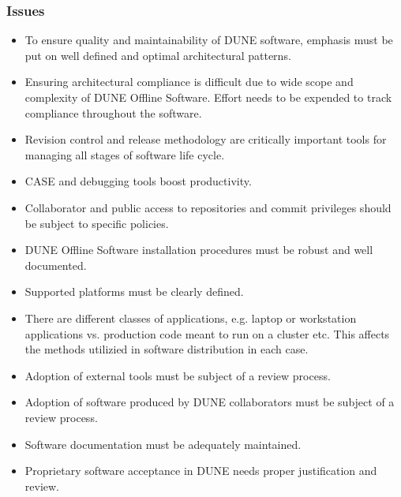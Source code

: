 \subsubsection{Issues}
\begin{itemize}

\item To ensure quality and maintainability of DUNE software, emphasis must be put on well defined and optimal architectural patterns.

\item Ensuring architectural compliance is difficult due to wide scope and complexity of DUNE Offline Software. 
Effort needs to be expended to track compliance throughout the software.

\item Revision control and release methodology are critically important tools for managing all stages of software life cycle.

\item CASE and debugging tools boost productivity.

\item Collaborator and public access to repositories and commit privileges should be subject to specific policies.

\item DUNE Offline Software installation procedures must be robust and well documented.

\item Supported platforms must be clearly defined.

\item There are different classes of applications, e.g. laptop or workstation applications vs. production code meant to run on a cluster etc. This affects the methods utilizied in software distribution in each case.

\item Adoption of external tools must be subject of a review process.

\item Adoption of software produced by DUNE collaborators  must be subject of a review process.

\item Software documentation must be adequately maintained.

\item Proprietary software acceptance in DUNE needs proper justification and review.


\end{itemize}

